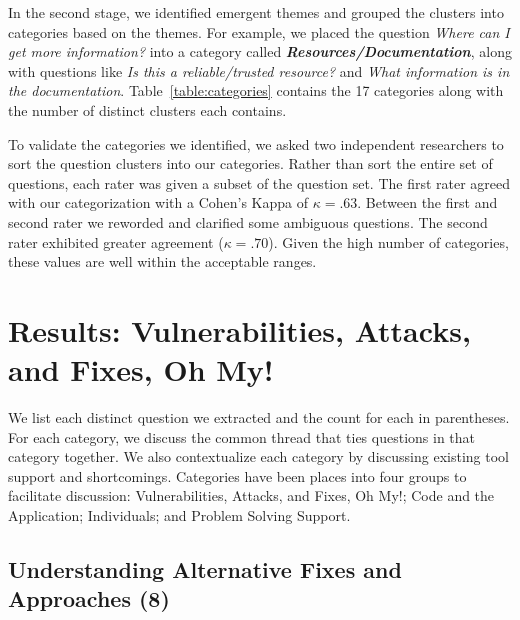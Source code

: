 \documentclass[conference]{IEEEtran}
\begin{document}
In the second stage, we identified emergent themes and grouped the clusters into categories based on the themes. 
For example, we placed the question \textit{Where can I get more information?} into a category called \emph{\textbf{Resources/Documentation}}, along with questions like \textit{Is this a reliable/trusted resource?} and \textit{What information is in the documentation}. 
Table~\ref{table:categories} contains the 17 categories along with the number of distinct clusters each contains. 

To validate the categories we identified, we asked two independent researchers to sort the question clusters into our categories. 
Rather than sort the entire set of questions, each rater was given a subset of the question set. 
The first rater agreed with our categorization with a Cohen's Kappa of $\kappa = .63$. 
Between the first and second rater we reworded and clarified some ambiguous questions. The second rater exhibited greater agreement ($\kappa = .70$). 
Given the high number of categories, these values are well within the acceptable ranges.

\section{Results: Vulnerabilities, Attacks, and Fixes, Oh My!}
\label{sec:results-vaf}
We list each distinct question we extracted and the count for each in parentheses. For each category, we discuss the common thread that ties questions in that category together. 
We also contextualize each category by discussing existing tool support and shortcomings.
Categories have been places into four groups to facilitate discussion: Vulnerabilities, Attacks, and Fixes, Oh My!; Code and the Application; Individuals; and Problem Solving Support.



\noindent\subsection{\textbf{Understanding Alternative Fixes and Approaches (8)}}\label{uafa}
\end{document}
